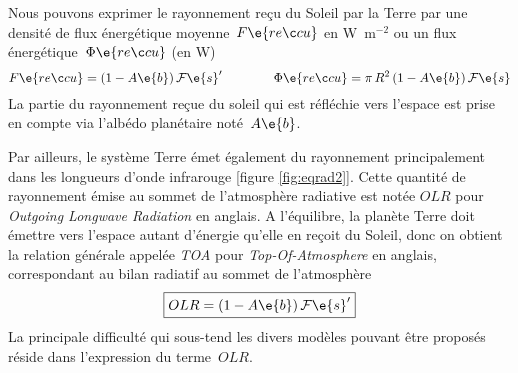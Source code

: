 \sk
Nous pouvons exprimer le rayonnement reçu du Soleil par la Terre par une densité de flux énergétique moyenne~$F\e{reçu}$ en W~m$^{-2}$ ou un flux énergétique~$\Phi\e{reçu}$ (en W)
\[ 
F\e{reçu} = (1-A\e{b}) \, \mathcal{F}\e{s}' 
\qquad \qquad
\Phi\e{reçu} = \pi \, R^2 \, (1-A\e{b}) \, \mathcal{F}\e{s}
\] 
La partie du rayonnement reçue du soleil qui est réfléchie vers l'espace est prise en compte via l'albédo planétaire noté~$A\e{b}$.

\sk
Par ailleurs, le système Terre émet également du rayonnement principalement dans les longueurs d'onde infrarouge [figure \ref{fig:eqrad2}]. 
Cette quantité de rayonnement émise au sommet de l'atmosphère radiative est notée $OLR$ pour \emph{Outgoing Longwave Radiation} en anglais.
A l'équilibre, la planète Terre doit émettre vers l'espace autant d'énergie qu'elle en reçoit du Soleil, donc
on obtient la relation générale appelée \emph{TOA} pour \emph{Top-Of-Atmosphere} en anglais, correspondant
au bilan radiatif au sommet de l'atmosphère
\[ 
\boxed{OLR = (1-A\e{b}) \, \mathcal{F}\e{s}'}
\] 
La principale difficulté qui sous-tend les divers modèles pouvant être proposés réside dans l'expression du terme~$OLR$.


